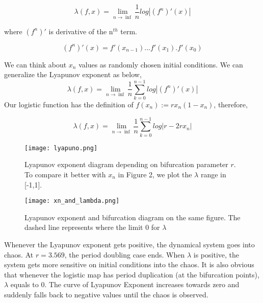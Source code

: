 \documentclass[12pt]{article}
\begin{document}
\begin{equation}
\lambda (f,x) = \lim_{n \to \inf} \frac{1}{n} log |(f^n)'(x)|
\end{equation}

where  $(f^n)' $ is derivative of the n$^{th}$ term.

\begin{equation*}
(f^n)'(x) = f'(x_{n-1})...f'(x_1).f'(x_0)
\end{equation*}

We can think about $x_n$ values as randomly chosen initial conditions. We can generalize the Lyapunov exponent as below,
\begin{equation}
\lambda (f,x) = \lim_{n \to \inf} \frac{1}{n} \sum_{k=0}^{n-1} log |(f^n)'(x)|
\end{equation}
Our logistic function has the definition of $f(x_n):= rx_n(1-x_n)$, therefore,

 \begin{equation}
\lambda (f,x) = \lim_{n \to \inf} \frac{1}{n} \sum_{k=0}^{n-1} log |r-2rx_n|
\end{equation}


\begin{figure}[h!]
	\centering
	\texttt{[image: lyapuno.png]}
		\caption{Lyapunov exponent diagram depending on bifurcation parameter $r$. To compare it better with $x_n$ in Figure 2, we plot the $\lambda$ range in [-1,1]. }
\end{figure}  

\begin{figure}[h!]
	\centering
	\texttt{[image: xn\_and\_lambda.png]}
		\caption{Lyapunov exponent and bifurcation diagram on the same figure. The dashed line represents where the limit 0 for $\lambda$ }
\end{figure} 
\newpage
Whenever the Lyapunov exponent gets positive, the dynamical system goes into chaos. At $r=3.569$, the period doubling case ends. When $\lambda$ is positive, the system gets more sensitive on initial conditions into the chaos. It is also obvious that whenever the logistic map has period duplication (at the bifurcation points), $\lambda$ equals to $0$. The curve of Lyapunov Exponent increases towards zero and suddenly falls back to negative values until the chaos is observed. 
   
\end{document}
